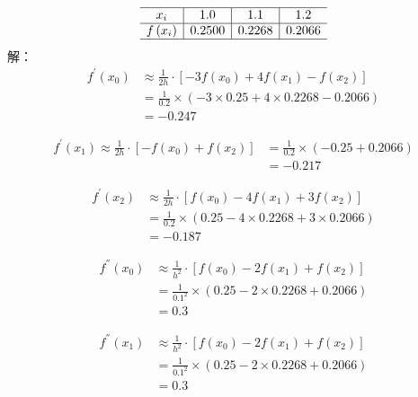 \documentclass[UTF8]{ctexart}
\begin{document}
$$
\begin{array}{c|c|c|c}
  \hline x_{i} & 1.0 & 1.1 & 1.2 \\
  \hline f\left(x_{i}\right) & 0.2500 & 0.2268 & 0.2066 \\
  \hline
  \end{array}
$$
解：
\begin{equation}\nonumber
    \begin{split}
        f^{'}(x_0) &\approx \frac{1}{2h}\cdot[-3f(x_0)+4f(x_1)-f(x_2)]\\
        &=\frac{1}{0.2} \times (-3\times0.25+4\times0.2268-0.2066)\\
        &= -0.247
    \end{split}
\end{equation}

\begin{equation}\nonumber
    \begin{split}
        f^{'}(x_1) \approx \frac{1}{2h}\cdot[-f(x_0)+f(x_2)]
        &=\frac{1}{0.2} \times (-0.25+0.2066)\\
        &= -0.217
    \end{split}
\end{equation}

\begin{equation}\nonumber
    \begin{split}
        f^{'}(x_2) &\approx \frac{1}{2h}\cdot[f(x_0)-4f(x_1)+3f(x_2)]\\
        &=\frac{1}{0.2} \times (0.25-4\times0.2268+3\times0.2066)\\
        &= -0.187
    \end{split}
\end{equation}

\begin{equation}\nonumber
    \begin{split}
        f^{''}(x_0) &\approx \frac{1}{h^2}\cdot[f(x_0)-2f(x_1)+f(x_2)]\\
        &=\frac{1}{{0.1}^2} \times (0.25-2\times0.2268+0.2066)\\
        &= 0.3
    \end{split}
\end{equation}

\begin{equation}\nonumber
    \begin{split}
        f^{''}(x_1) &\approx \frac{1}{h^2}\cdot[f(x_0)-2f(x_1)+f(x_2)]\\
        &=\frac{1}{{0.1}^2} \times (0.25-2\times0.2268+0.2066)\\
        &= 0.3
    \end{split}
\end{equation}
\end{document}
